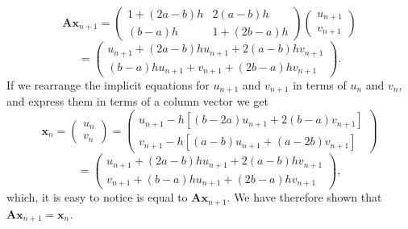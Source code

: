 \documentclass[11pt,a4paper]{article}
\begin{document}
\[\boldsymbol{Ax}_{n+1}=\begin{pmatrix}1+(2a-b)h& 2(a-b)h\\ (b-a)h & 1+(2b-a)h\end{pmatrix}\begin{pmatrix} u_{n+1}\\ v_{n+1}\end{pmatrix}\]
\[= \begin{pmatrix}u_{n+1}+(2a-b)hu_{n+1} + 2(a-b)hv_{n+1}\\ (b-a)hu_{n+1}+v_{n+1}+(2b-a)hv_{n+1}\end{pmatrix}.\]
If we rearrange the implicit equations for $u_{n+1}$ and $v_{n+1}$ in terms of $u_n$ and $v_n$, and express them in terms of a column vector we get
\[\boldsymbol{x}_n =\begin{pmatrix}u_n\\v_n \end{pmatrix}= \begin{pmatrix}u_{n+1}-h[(b-2a)u_{n+1}+2(b-a)v_{n+1}]\\ v_{n+1}-h[(a-b)u_{n+1}+(a-2b)v_{n+1}]\end{pmatrix}\]
\[=\begin{pmatrix}u_{n+1}+(2a-b)hu_{n+1}+2(a-b)hv_{n+1}\\ v_{n+1}+(b-a)hu_{n+1}+(2b-a)hv_{n+1}\end{pmatrix},\]
which, it is easy to notice is equal to $\boldsymbol{Ax}_{n+1}.$ We have therefore shown that $\boldsymbol{Ax}_{n+1}=\boldsymbol{x}_n.$
\end{document}
